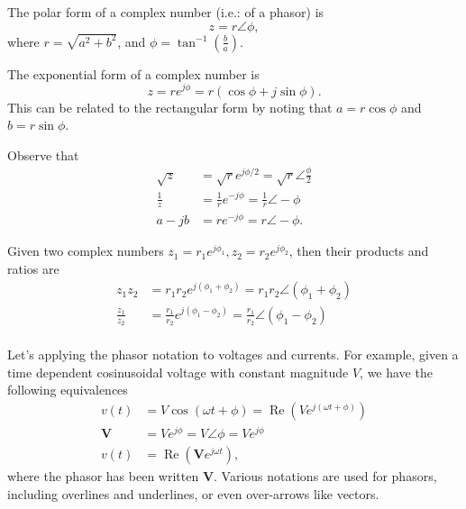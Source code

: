 \documentclass[letterpaper]{scrartcl}
\newcommand{\lr}[1]{\left(#1\right)}
\newcommand{\inv}[1]{\frac{1}{#1}}
\DeclareMathOperator{\Real}{Re}
\newcommand{\BV}[0]{\mathbf{V}}
\begin{document}
The polar form of a complex number (i.e.: of a phasor) is
\begin{equation}\label{eqn:karlCircuitsCheatSheet:180}
z = r \angle \phi,
\end{equation}
where \( r = \sqrt{a^2 + b^2} \), and \( \phi = \tan^{-1}\lr{\frac{b}{a}} \).

The exponential form of a complex number is
\begin{equation}\label{eqn:karlCircuitsCheatSheet:200}
z = r e^{j\phi} = r \lr{ \cos\phi + j \sin\phi }.
\end{equation}
This can be related to the rectangular form by noting that \( a = r \cos\phi \) and \( b = r \sin \phi \).

Observe that
\begin{equation}\label{eqn:karlCircuitsCheatSheet:220}
\begin{aligned}
\sqrt{z} &= \sqrt{r} e^{j\phi/2} = \sqrt{r} \angle \frac{\phi}{2} \\
\inv{z} &= \inv{r} e^{-j\phi} = \inv{r} \angle -\phi \\
a - j b &= r e^{-j\phi} = r \angle -\phi.
\end{aligned}
\end{equation}

Given two complex numbers \( z_1 = r_1 e^{j\phi_1}, z_2 = r_2 e^{j\phi_2} \), then their products and ratios are
\begin{equation}\label{eqn:karlCircuitsCheatSheet:240}
\begin{aligned}
z_1 z_2 &= r_1 r_2 e^{j \lr{\phi_1 + \phi_2 } } = r_1 r_2 \angle \lr{ \phi_1 + \phi_2 } \\
\frac{z_1}{z_2} &= \frac{r_1}{r_2} e^{j \lr{\phi_1 - \phi_2 } } = \frac{r_1}{r_2} \angle \lr{ \phi_1 - \phi_2 } \\
\end{aligned}
\end{equation}

Let's applying the phasor notation to voltages and currents.  For example, given a time dependent cosinusoidal voltage with constant magnitude \( V \), we have the following equivalences
\begin{equation}\label{eqn:karlCircuitsCheatSheet:260}
\begin{aligned}
v(t) &= V \cos\lr{ \omega t + \phi } = \Real \lr{ V e^{j \lr{\omega t + \phi} } } \\
\BV &= V e^{j \phi} = V \angle \phi = V e^{j \phi} \\
v(t) &= \Real \lr{ \BV e^{j \omega t} },
\end{aligned}
\end{equation}
where the phasor has been written \( \BV \).  Various notations are used for phasors, including overlines and underlines, or even over-arrows like vectors.
\end{document}
